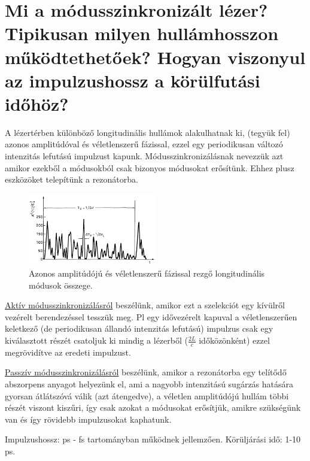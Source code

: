 \documentclass[12pt, a4paper]{article}
\begin{document}
\section{Mi a módusszinkronizált lézer? Tipikusan milyen hullámhosszon működtethetőek? Hogyan viszonyul az impulzushossz a körülfutási időhöz?}
A lézertérben különböző longitudinális hullámok alakulhatnak ki, (tegyük fel) azonos amplitúdóval és véletlenszerű fázissal, ezzel egy periodikusan változó intenzitás lefutású impulzust kapunk. Módusszinkronizálásnak nevezzük azt amikor ezekből a módusokból csak bizonyos módusokat erősítünk. Ehhez plusz eszközöket telepítünk a rezonátorba.

\begin{figure}[H]
\center
\includegraphics[width=0.5\textwidth]{longitudinalModes}
\caption{Azonos amplitúdójú és véletlenszerű fázissal rezgő longitudinális módusok összege.}
\end{figure}

\underline{Aktív módusszinkronizálásról} beszélünk, amikor ezt a szelekciót egy kívülről vezérelt berendezéssel tesszük meg. Pl egy idővezérelt kapuval a véletlenszerűen keletkező (de periodikusan állandó intenzitás lefutású) impulzus csak egy kiválasztott részét csatoljuk ki mindig a lézerből ($\frac{2L}{c}$ időközönként) ezzel megrövidítve az eredeti impulzust.

\underline{Passzív módusszinkronizálásról} beszélünk, amikor a rezonátorba egy telítődő abszorpens anyagot helyezünk el, ami a nagyobb intenzitású sugárzás hatására gyorsan átlátszóvá válik (azt átengedve), a véletlen amplitúdójú hullám többi részét viszont kiszűri, így csak azokat a módusokat erősítjük, amikre szükségünk van és így rövidebb impulzusokat kaphatunk.

Impulzushossz: ps - fs tartományban működnek jellemzően. Körüljárási idő: 1-10 ps.
\end{document}
